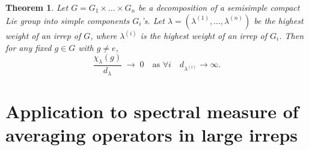\documentclass[11pt, a4paper]{article}
\newtheorem{theorem}{Theorem}[section]
\theoremstyle{definition}
\theoremstyle{remark}
\begin{document}
\begin{theorem}
\label{cor:critdiv}
Let $G=G_1\times\ldots\times G_n$ be a decomposition of a  semisimple compact Lie group into simple components $G_i$'s. Let $\lambda=(\lambda^{(1)}, \dots, \lambda^{(n)})$ be the highest weight of an irrep of $G$, where $\lambda^{(i)}$ is the highest weight of an irrep of $G_i$. Then for any fixed $g\in G$ with $g\neq e$,
\begin{equation}
\frac{\chi_\lambda(g)}{d_\lambda}\;\longrightarrow\;0 \quad 
\text{as } \forall i\quad d_{\lambda^{(i)}}\rightarrow\infty.
\end{equation}
\end{theorem}






\section{Application to spectral measure of averaging operators in large irreps}
\label{sec:quantumpart}
\end{document}
